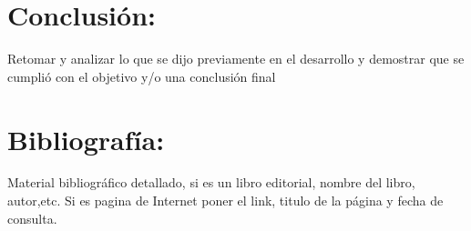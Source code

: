 \documentclass[12pt]{article}
\begin{document}
{{\begin{minipage}[c][\paperheight]{\paperwidth}
\begin{itemize}
\end{itemize}

\section*{Conclusión:}

Retomar y analizar lo que se dijo previamente en el desarrollo y demostrar que
se cumplió con el objetivo y/o una conclusión final 

\section*{Bibliografía:}

Material bibliográfico detallado, si es un libro editorial, nombre del libro,
autor,etc. Si es pagina de Internet poner el link, titulo de la página y fecha
de consulta.

\end{minipage}
}

}
\end{document}
